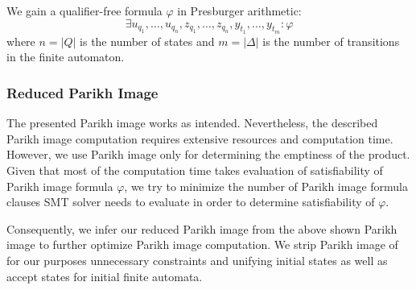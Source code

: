 We gain a qualifier-free formula $\varphi$ in Presburger arithmetic:
$$ \exists u_{q_1},\ldots,u_{q_n},z_{q_1},\ldots,z_{q_n},y_{t_1},\ldots,y_{t_m} : \varphi $$
where $n = |Q|$ is the number of states and $m = |\Delta|$ is the number of transitions in the finite automaton.

\subsubsection{Reduced Parikh Image}\label{sec:reducedParikhImage}

The presented Parikh image works as intended. Nevertheless, the described Parikh image computation requires extensive resources and computation time. However, we use Parikh image only for determining the emptiness of the product. Given that most of the computation time takes evaluation of satisfiability of Parikh image formula $\varphi$, we try to minimize the number of Parikh image formula clauses SMT solver needs to evaluate in order to determine satisfiability of $\varphi$.

Consequently, we infer our reduced Parikh image from the above shown Parikh image to further optimize Parikh image computation. We strip Parikh image of for our purposes unnecessary constraints and unifying initial states as well as accept states for initial finite automata.


